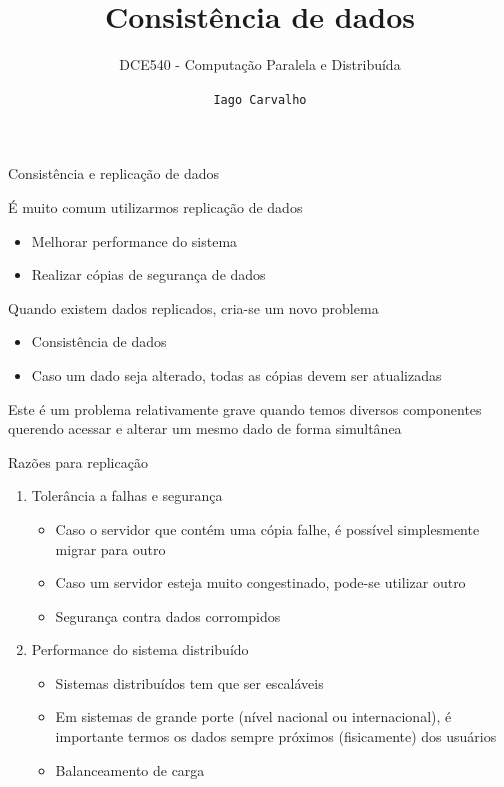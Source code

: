 \documentclass[compress]{beamer}
\title{Consistência de dados}
\subtitle{DCE540 - Computação Paralela e Distribuída}
\author{\texttt{Iago Carvalho}}
\institute{\texttt{Departamento de Ciência da Computação}}
\begin{document}
\begin{frame}
\titlepage

\end{frame}


\begin{frame}{Consistência e replicação de dados}

É muito comum utilizarmos replicação de dados
\begin{itemize}
    \item Melhorar performance do sistema
    \item Realizar cópias de segurança de dados
\end{itemize}

\vspace{0.5cm}

Quando existem dados replicados, cria-se um novo problema
\begin{itemize}
    \item Consistência de dados
    \item Caso um dado seja alterado, todas as cópias devem ser atualizadas
\end{itemize}

\vspace{0.5cm}

Este é um problema relativamente grave quando temos diversos componentes querendo acessar e alterar um mesmo dado de forma simultânea
\end{frame}


\begin{frame}{Razões para replicação}

\begin{enumerate}
    \item Tolerância a falhas e segurança
    \begin{itemize}
        \item Caso o servidor que contém uma cópia falhe, é possível simplesmente migrar para outro
        \item Caso um servidor esteja muito congestinado, pode-se utilizar outro
        \item Segurança contra dados corrompidos
    \end{itemize}
    \vspace{0.5cm}
    \item Performance do sistema distribuído
    \begin{itemize}
        \item Sistemas distribuídos tem que ser escaláveis
        \item Em sistemas de grande porte (nível nacional ou internacional), é importante termos os dados sempre próximos (fisicamente) dos usuários
        \item Balanceamento de carga
    \end{itemize}
\end{enumerate}

\end{frame}
\end{document}
